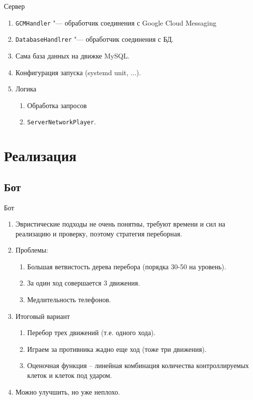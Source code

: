 \documentclass{beamer}
\def\t{\texttt}
\begin{document}
\begin{frame}[t]{Сервер}
	\begin{enumerate}
		\item
			\t{GCMHandler} "--- обработчик соединения с Google Cloud Messaging

		\item
			\t{DatabaseHandlrer} "--- обработчик соединения с БД.

		\item
			Сама база данных на движке MySQL.

		\item
			Конфигурация запуска (systemd unit, ...).

		\item Логика
			\begin{enumerate}
				\item Обработка запросов
				\item \t{ServerNetworkPlayer}.
			\end{enumerate}
	\end{enumerate}
\end{frame}

\section{Реализация}
\subsection{Бот}

\begin{frame}[t]{Бот}
	\begin{enumerate}
	\item
		Эвристические подходы не очень понятны, требуют времени и сил на реализацию и проверку, поэтому стратегия переборная.

	\item
		Проблемы:
		\begin{enumerate}
			\item Большая ветвистость дерева перебора (порядка 30-50 на уровень).
			\item За один ход совершается 3 движения.
			\item Медлительность телефонов.
		\end{enumerate}

	\item
		Итоговый вариант
		\begin{enumerate}
			\item Перебор трех движений (т.е. одного хода).
			\item Играем за противника жадно еще ход (тоже три движения).
			\item Оценочная функция -- линейная комбинация количества контроллируемых клеток и клеток под ударом.
		\end{enumerate}

	\item
		Можно улучшить, но уже неплохо.
	\end{enumerate}
\end{frame}
\end{document}
